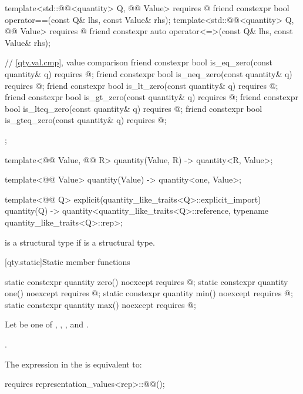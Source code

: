 \begin{codeblock}
{{  template<std::@@<quantity> Q, @@ Value>
    requires @\seebelownc@
  friend constexpr bool operator==(const Q& lhs, const Value& rhs);
  template<std::@@<quantity> Q, @@ Value>
    requires @\seebelownc@
  friend constexpr auto operator<=>(const Q& lhs, const Value& rhs);

  // \ref{qty.val.cmp}, value comparison
  friend constexpr bool is_eq_zero(const quantity& q) requires @\seebelownc@;
  friend constexpr bool is_neq_zero(const quantity& q) requires @\seebelownc@;
  friend constexpr bool is_lt_zero(const quantity& q) requires @\seebelownc@;
  friend constexpr bool is_gt_zero(const quantity& q) requires @\seebelownc@;
  friend constexpr bool is_lteq_zero(const quantity& q) requires @\seebelownc@;
  friend constexpr bool is_gteq_zero(const quantity& q) requires @\seebelownc@;
};

template<@@ Value, @@ R>
quantity(Value, R) -> quantity<R{}, Value>;

template<@@ Value>
quantity(Value) -> quantity<one, Value>;

template<@@ Q>
explicit(quantity_like_traits<Q>::explicit_import) quantity(Q)
  -> quantity<quantity_like_traits<Q>::reference, typename quantity_like_traits<Q>::rep>;

}
\end{codeblock}

\pnum
{} is a structural type
if  is a structural type.

[qty.static]{Static member functions}

\begin{itemdecl}
static constexpr quantity zero() noexcept
  requires @\seebelownc@;
static constexpr quantity one() noexcept
  requires @\seebelownc@;
static constexpr quantity min() noexcept
  requires @\seebelownc@;
static constexpr quantity max() noexcept
  requires @\seebelownc@;
\end{itemdecl}

\begin{itemdescr}
\pnum
Let  be one of , , , and .

\pnum
\returns
{}.

\pnum
\remarks
The expression in the  is equivalent to:
\begin{codeblock}
requires { representation_values<rep>::@@(); }
\end{codeblock}
\end{itemdescr}

